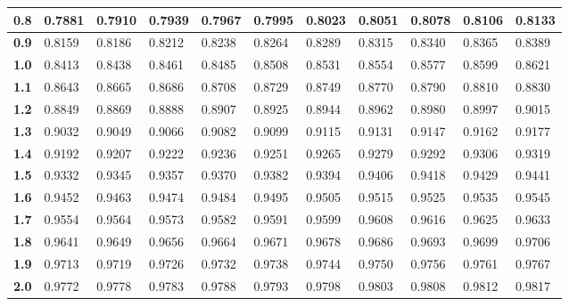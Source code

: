 \begin{alternateColorTable}
\begin{longtable}{|l|l|l|l|l|l|l|l|l|l|l|}
    \textbf{0.8}  & 0.7881  & 0.7910  & 0.7939  & 0.7967  & 0.7995  & 0.8023  & 0.8051  & 0.8078  & 0.8106  & 0.8133\\ \hline
    
    \textbf{0.9}  & 0.8159  & 0.8186  & 0.8212  & 0.8238  & 0.8264  & 0.8289  & 0.8315  & 0.8340  & 0.8365  & 0.8389\\ \hline
    
    \textbf{1.0}  & 0.8413  & 0.8438  & 0.8461  & 0.8485  & 0.8508  & 0.8531  & 0.8554  & 0.8577  & 0.8599  & 0.8621\\ \hline
    
    \textbf{1.1}  & 0.8643  & 0.8665  & 0.8686  & 0.8708  & 0.8729  & 0.8749  & 0.8770  & 0.8790  & 0.8810  & 0.8830\\ \hline
    
    \textbf{1.2}  & 0.8849  & 0.8869  & 0.8888  & 0.8907  & 0.8925  & 0.8944  & 0.8962  & 0.8980  & 0.8997  & 0.9015\\ \hline
    
    \textbf{1.3}  & 0.9032  & 0.9049  & 0.9066  & 0.9082  & 0.9099  & 0.9115  & 0.9131  & 0.9147  & 0.9162  & 0.9177\\ \hline
    
    \textbf{1.4}  & 0.9192  & 0.9207  & 0.9222  & 0.9236  & 0.9251  & 0.9265  & 0.9279  & 0.9292  & 0.9306  & 0.9319\\ \hline
    
    \textbf{1.5}  & 0.9332  & 0.9345  & 0.9357  & 0.9370  & 0.9382  & 0.9394  & 0.9406  & 0.9418  & 0.9429  & 0.9441\\ \hline
    
    \textbf{1.6}  & 0.9452  & 0.9463  & 0.9474  & 0.9484  & 0.9495  & 0.9505  & 0.9515  & 0.9525  & 0.9535  & 0.9545\\ \hline
    
    \textbf{1.7}  & 0.9554  & 0.9564  & 0.9573  & 0.9582  & 0.9591  & 0.9599  & 0.9608  & 0.9616  & 0.9625  & 0.9633\\ \hline
    
    \textbf{1.8}  & 0.9641  & 0.9649  & 0.9656  & 0.9664  & 0.9671  & 0.9678  & 0.9686  & 0.9693  & 0.9699  & 0.9706\\ \hline
    
    \textbf{1.9}  & 0.9713  & 0.9719  & 0.9726  & 0.9732  & 0.9738  & 0.9744  & 0.9750  & 0.9756  & 0.9761  & 0.9767\\ \hline
    
    \textbf{2.0}  & 0.9772  & 0.9778  & 0.9783  & 0.9788  & 0.9793  & 0.9798  & 0.9803  & 0.9808  & 0.9812  & 0.9817\\ \hline
    

\end{longtable}
\end{alternateColorTable}
